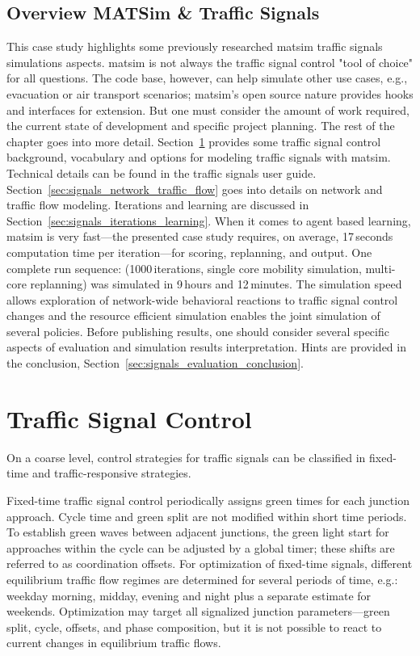 \subsection{Overview MATSim \& Traffic Signals}
This case study highlights some previously researched \gls{matsim} traffic signals simulations aspects. 
\gls{matsim} is not always the traffic signal control "tool of choice" for all questions. 
The code base, however, can help simulate other use cases, e.g.,\,evacuation or air transport scenarios; 
\gls{matsim}'s open source nature provides hooks and interfaces for extension. 
But one must consider the amount of work required, the current state of development and specific project planning. 
The rest of the chapter goes into more detail.  
Section~\ref{sec:signals_traffic_signal_control} provides some traffic signal control background, vocabulary and options for modeling traffic signals with \gls{matsim}. 
Technical details can be found in the traffic signals user guide.  
Section~\ref{sec:signals_network_traffic_flow} goes into details on network and traffic flow modeling. 
Iterations and learning are discussed in Section~\ref{sec:signals_iterations_learning}. 
When it comes to agent based learning, \gls{matsim} is very fast---the presented case study requires, on average, 17\,seconds computation time per iteration---for scoring, replanning, and output. One complete run sequence: (1000\,iterations, single core mobility simulation, multi-core replanning) was simulated in 9\,hours and 12\,minutes. 
The simulation speed allows exploration of network-wide behavioral reactions to  traffic signal control changes and 
the resource efficient simulation enables the joint simulation of several policies. 
Before publishing results, one should consider several specific aspects of evaluation and simulation results interpretation. 
Hints are provided in the conclusion,  Section~\ref{sec:signals_evaluation_conclusion}. 

\section{Traffic Signal Control}
\label{sec:signals_traffic_signal_control}
On a coarse level, control strategies for traffic signals can be classified in fixed-time and traffic-responsive strategies. 

Fixed-time traffic signal control periodically assigns green times for each junction approach. 
Cycle time and green split are not modified within short time periods. 
To establish green waves between adjacent junctions, the green light start for approaches within the cycle can be adjusted by a global timer; 
these shifts are referred to as coordination offsets. 
For optimization of fixed-time signals, different equilibrium traffic flow regimes are determined for several periods of time, e.g.: weekday morning, midday, evening and night plus a separate estimate for weekends. Optimization may target all signalized junction parameters---green split, cycle, offsets, and phase composition,  
but it is not possible to react to current changes in equilibrium traffic flows. 

